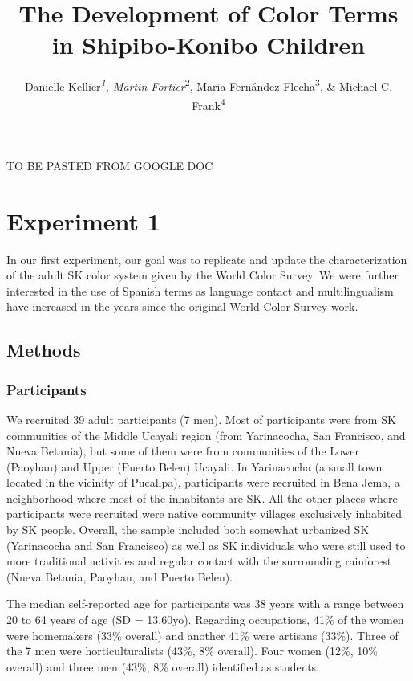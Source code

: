 \documentclass[,man,floatsintext]{apa6}
\title{The Development of Color Terms in Shipibo-Konibo Children}
\author{Danielle Kellier\emph{\textsuperscript{1}, Martin
Fortier}\textsuperscript{2}, Maria Fernández Flecha\textsuperscript{3},
\& Michael C. Frank\textsuperscript{4}}
\date{}
\affiliation{
\vspace{0.5cm}
\textsuperscript{1} University of Pennsylvania\\\textsuperscript{2} PSL Research University\\\textsuperscript{3} Pontificia Universidad Católica del Perú\\\textsuperscript{4} Stanford University}
\theoremstyle{definition}
\theoremstyle{definition}
\theoremstyle{definition}
\theoremstyle{remark}
\begin{document}
\maketitle

TO BE PASTED FROM GOOGLE DOC

\section{Experiment 1}\label{experiment-1}

In our first experiment, our goal was to replicate and update the
characterization of the adult SK color system given by the World Color
Survey. We were further interested in the use of Spanish terms as
language contact and multilingualism have increased in the years since
the original World Color Survey work.

\subsection{Methods}\label{methods}

\subsubsection{Participants}\label{participants}

We recruited 39 adult participants (7 men). Most of participants were
from SK communities of the Middle Ucayali region (from Yarinacocha, San
Francisco, and Nueva Betania), but some of them were from communities of
the Lower (Paoyhan) and Upper (Puerto Belen) Ucayali. In Yarinacocha (a
small town located in the vicinity of Pucallpa), participants were
recruited in Bena Jema, a neighborhood where most of the inhabitants are
SK. All the other places where participants were recruited were native
community villages exclusively inhabited by SK people. Overall, the
sample included both somewhat urbanized SK (Yarinacocha and San
Francisco) as well as SK individuals who were still used to more
traditional activities and regular contact with the surrounding
rainforest (Nueva Betania, Paoyhan, and Puerto Belen).

The median self-reported age for participants was 38 years with a range
between 20 to 64 years of age (SD = 13.60yo). Regarding occupations,
41\% of the women were homemakers (33\% overall) and another 41\% were
artisans (33\%). Three of the 7 men were horticulturalists (43\%, 8\%
overall). Four women (12\%, 10\% overall) and three men (43\%, 8\%
overall) identified as students.
\end{document}
